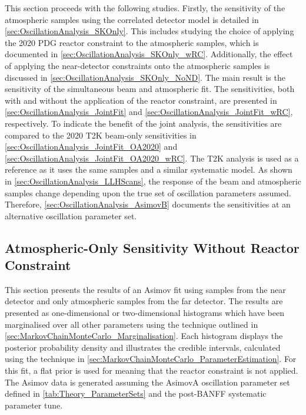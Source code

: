 This section proceeds with the following studies. Firstly, the sensitivity of the atmospheric samples using the correlated detector model is detailed in \autoref{sec:OscillationAnalysis_SKOnly}. This includes studying the choice of applying the 2020 PDG reactor constraint \cite{Particle_Data_Group2020-ms} to the atmospheric samples, which is documented in \autoref{sec:OscillationAnalysis_SKOnly_wRC}. Additionally, the effect of applying the near-detector constraints onto the atmospheric samples is discussed in \autoref{sec:OscillationAnalysis_SKOnly_NoND}. The main result is the sensitivity of the simultaneous beam and atmospheric fit. The sensitivities, both with and without the application of the reactor constraint, are presented in \autoref{sec:OscillationAnalysis_JointFit} and \autoref{sec:OscillationAnalysis_JointFit_wRC}, respectively. To indicate the benefit of the joint analysis, the sensitivities are compared to the 2020 T2K beam-only sensitivities \cite{Dunne2020-uf, t2k_tn_393} in \autoref{sec:OscillationAnalysis_JointFit_OA2020} and \autoref{sec:OscillationAnalysis_JointFit_OA2020_wRC}. The T2K analysis is used as a reference as it uses the same samples and a similar systematic model. As shown in \autoref{sec:OscillationAnalysis_LLHScans}, the response of the beam and atmospheric samples change depending upon the true set of oscillation parameters assumed. Therefore, \autoref{sec:OscillationAnalysis_AsimovB} documents the sensitivities at an alternative oscillation parameter set.

\subsection{Atmospheric-Only Sensitivity Without Reactor Constraint}
\label{sec:OscillationAnalysis_SKOnly}

This section presents the results of an Asimov fit using samples from the near detector and only atmospheric samples from the far detector. The results are presented as one-dimensional or two-dimensional histograms which have been marginalised over all other parameters using the technique outlined in \autoref{sec:MarkovChainMonteCarlo_Marginalisation}. Each histogram displays the posterior probability density and illustrates the credible intervals, calculated using the technique in \autoref{sec:MarkovChainMonteCarlo_ParameterEstimation}. For this fit, a flat prior is used for  meaning that the reactor constraint is not applied. The Asimov data is generated assuming the AsimovA oscillation parameter set defined in \autoref{tab:Theory_ParameterSets} and the post-BANFF systematic parameter tune.

